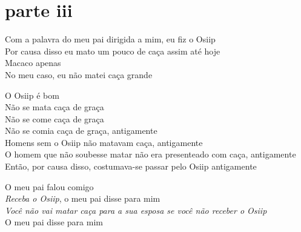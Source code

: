  
 \medskip
 \section{parte iii}

 \noindent Com a palavra do meu pai dirigida a mim, eu fiz o Osiip\\
 Por causa disso eu mato um pouco de caça assim até hoje\\
 Macaco apenas\\
 No meu caso, eu não matei caça grande
 
 \smallskip
 \begin{center}\end{center}
 \smallskip
 
\noindent O Osiip é bom\\
 Não se mata caça de graça\\
 Não se come caça de graça\\
 Não se comia caça de graça, antigamente\\
 Homens sem o Osiip não matavam caça, antigamente\\
 O homem que não soubesse matar não era presenteado com caça, antigamente\\
 Então, por causa disso, costumava-se passar pelo Osiip antigamente
 
 \smallskip
 \begin{center}\end{center}
 \smallskip
 
\noindent O meu pai falou comigo\\
 \textit{Receba o Osiip}, o meu pai disse para mim\\
 \textit{Você não vai matar caça para a sua esposa se você não receber o Osiip}\\
 O meu pai disse para mim
 

